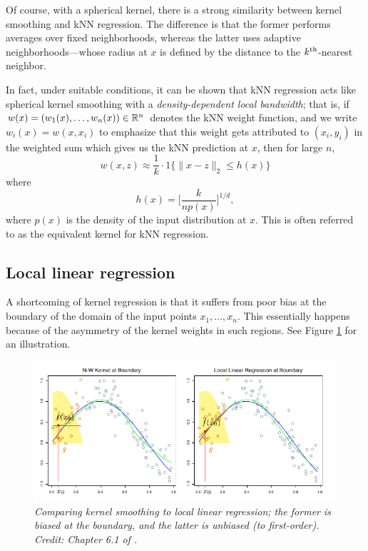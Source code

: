 \documentclass{article}
\begin{document}
Of course, with a spherical kernel, there is a strong similarity between kernel
smoothing and kNN regression. The difference is that the former performs
averages over fixed neighborhoods, whereas the latter uses adaptive
neighborhoods---whose radius at $x$ is defined by the distance to the
$k^{\text{th}}$-nearest neighbor.  

In fact, under suitable conditions, it can be shown that kNN regression acts
like spherical kernel smoothing with a \emph{density-dependent local bandwidth}; 
that is, if $w(x) = (w_1(x), \dots, w_n(x)) \in \mathbb{R}^n$ denotes the kNN weight
function, and we write $w_i(x) = w(x, x_i)$ to emphasize that this weight gets
attributed to $(x_i, y_i)$ in the weighted sum  which gives us the kNN prediction at $x$, then for large $n$, 
\[
w(x, z) \approx \frac{1}{k} \cdot 1\{ \|x - z\|_2 \leq h(x) \} 
\]
where 
\[
h(x) = \bigg[ \frac{k}{n p(x)} \bigg]^{1/d},
\]
where $p(x)$ is the density of the input distribution at $x$. This is often
referred to as the equivalent kernel for kNN regression.  

\subsection{Local linear regression}

A shortcoming of kernel regression is that it suffers from poor bias at the
boundary of the domain of the input points $x_1,\dots,x_n$. This essentially
happens because of the asymmetry of the kernel weights in such regions. See
Figure \ref{fig:bias} for an illustration. 

\begin{figure}[tb]
\centering
\includegraphics[width=\textwidth]{bias.pdf}
\caption{\it Comparing kernel smoothing to local linear regression; the former
  is biased at the boundary, and the latter is unbiased (to
  first-order). Credit: Chapter 6.1 of \citet{hastie2009elements}.}  
\label{fig:bias}
\end{figure}
\end{document}
